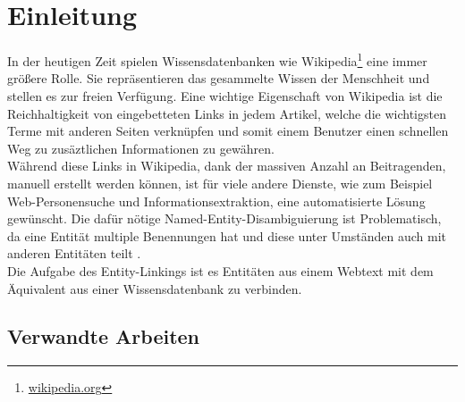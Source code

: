 \documentclass[11pt, a4paper, oneside]{Thesis} %
\begin{document}
\pagestyle{fancy} %

\chapter{Einleitung}
\label{Kapitel 1}

In der heutigen Zeit spielen Wissensdatenbanken wie Wikipedia\footnote{\url{wikipedia.org}} eine immer gr\"o\ss ere Rolle. Sie repr\"asentieren das gesammelte Wissen der Menschheit und stellen es zur freien Verf\"ugung. Eine wichtige Eigenschaft von Wikipedia ist die Reichhaltigkeit von eingebetteten Links in jedem Artikel, welche die wichtigsten Terme mit anderen Seiten verknüpfen und somit einem Benutzer einen schnellen Weg zu zus\"aztlichen Informationen zu gew\"ahren\citep{rada07}.\\
W\"ahrend diese Links in Wikipedia, dank der massiven Anzahl an Beitragenden, manuell erstellt werden k\"onnen, ist f\"ur viele andere Dienste, wie zum Beispiel Web-Personensuche und Informationsextraktion, eine automatisierte L\"osung gew\"unscht. Die daf\"ur n\"otige Named-Entity-Disambiguierung ist Problematisch, da eine Entit\"at multiple Benennungen hat und diese unter Umst\"anden auch mit anderen Entit\"aten teilt \cite{wei10}.\\
Die Aufgabe des Entity-Linkings ist es Entit\"aten aus einem Webtext mit dem \"Aquivalent aus einer Wissensdatenbank zu verbinden. 

\section{Verwandte Arbeiten}
\end{document}

